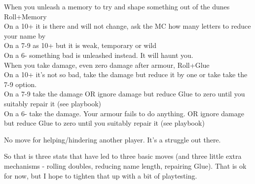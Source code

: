  
 When you unleash a memory to try and shape something out of the dunes Roll+Memory
\\On a 10+ it is there and will not change, ask the MC how many letters to reduce your name by
\\On a 7-9 as 10+ but it is weak, temporary or wild
\\On a 6- something bad is unleashed instead. It will haunt you.
\\
 
 When you take damage, even zero damage after armour, Roll+Glue
\\ On a 10+ it's not so bad, take the damage but reduce it by one or take take the 7-9 option.
\\ On a 7-9 take the damage OR ignore damage but reduce Glue to zero until you suitably repair it (see playbook)
\\ On a 6- take the damage. Your armour fails to do anything.  OR ignore damage but reduce Glue to zero until you suitably repair it (see playbook)

 No move for helping/hindering another player. It's a struggle out there. 

So that is three stats that have led to three basic moves (and three little extra mechanisms - rolling doubles, reducing name length, repairing Glue). That is ok for now, but I hope to tighten that up with a bit of playtesting.

\newpage
